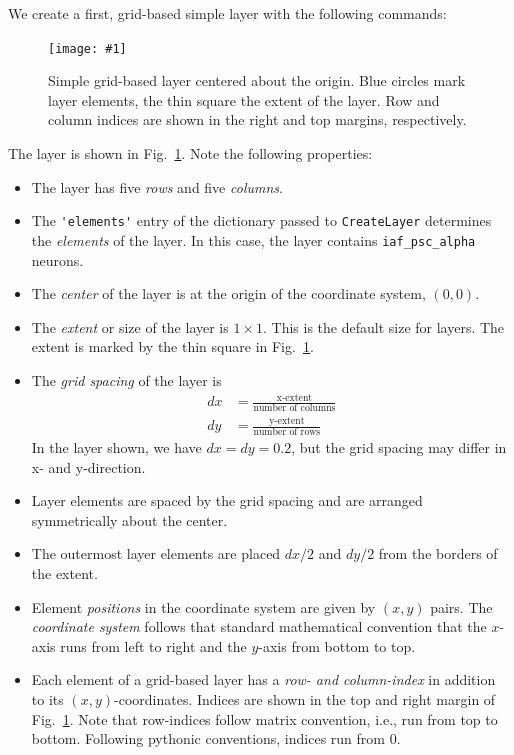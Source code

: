 \documentclass[a4paper,12pt]{report}
\newcommand{\scriptfig}[4]{%
\begin{figure}
\centerline{\texttt{[image: \#1]}}
\caption[#3]{#4}
\label{fig:#1}
\end{figure}%
}
\begin{document}
We create a first, grid-based simple layer
with the following commands:
%

\scriptfig{layer1}{0.5}{Simple grid-based layer}%
{Simple grid-based layer centered about the origin. Blue circles mark
layer elements, the thin square the extent of the layer. Row and
column indices are shown in the right and top margins, respectively.}
%
The layer is shown in Fig.~\ref{fig:layer1}. Note the following
properties:
\begin{itemize}
\item The layer has five \emph{rows} and five
  \emph{columns}.
\item The \lstinline!'elements'! entry of the dictionary passed to
  \lstinline!CreateLayer! determines the
  \emph{elements} of the layer. In this case, the layer
  contains \lstinline!iaf_psc_alpha! neurons.
\item The \emph{center} of the layer is at the origin of
  the coordinate system, $(0,0)$.
\item The \emph{extent} or size of the layer is $1\times
  1$. This is the default size for layers. The extent is marked by the
  thin square in Fig.~\ref{fig:layer1}.
\item The \emph{grid spacing} of the layer is
\begin{equation}\label{eq:dx_dy_extent}\begin{split}
dx &= \frac{\text{x-extent}}{\text{number of columns}} \\
dy &= \frac{\text{y-extent}}{\text{number of rows}}
\end{split}\end{equation}
In the layer shown, we have $dx=dy=0.2$, but the grid spacing may differ
in x- and y-direction.
\item Layer elements are spaced by the grid spacing and are arranged
  symmetrically about the center.
\item The outermost layer elements are placed $dx/2$ and $dy/2$ from
  the borders of the extent.
\item Element \emph{positions} in the coordinate
  system are given by $(x,y)$ pairs. The \emph{coordinate
    system} follows that standard
  mathematical convention that the $x$-axis runs from left to right
  and the $y$-axis from bottom to top.
\item Each element of a grid-based layer has a \emph{row- and
    column-index}  in addition to its
  $(x,y)$-coordinates. Indices are shown in the top and right margin
  of Fig.~\ref{fig:layer1}. Note that row-indices follow matrix
  convention, i.e., run from top to bottom. Following pythonic
  conventions, indices run from 0.
\end{itemize}
\end{document}
